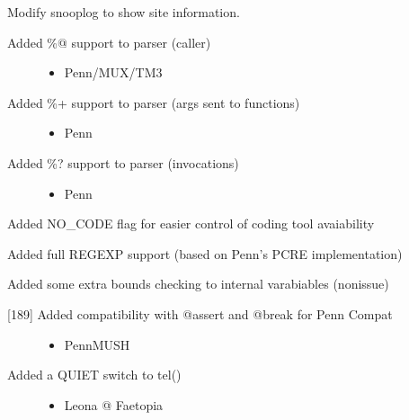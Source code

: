 \documentclass[letterpaper,10pt,english]{sphinxmanual}
\begin{document}
\sphinxAtStartPar
Modify snooplog to show site information.
\begin{description}
\item[{Added \%@ support to parser (caller)}] \leavevmode\begin{itemize}
\item {} 
\sphinxAtStartPar
Penn/MUX/TM3

\end{itemize}

\item[{Added \%+ support to parser (args sent to functions)}] \leavevmode\begin{itemize}
\item {} 
\sphinxAtStartPar
Penn

\end{itemize}

\item[{Added \%? support to parser (invocations)}] \leavevmode\begin{itemize}
\item {} 
\sphinxAtStartPar
Penn

\end{itemize}

\end{description}

\sphinxAtStartPar
Added NO\_CODE flag for easier control of coding tool avaiability

\sphinxAtStartPar
Added full REGEXP support (based on Penn’s PCRE implementation)

\sphinxAtStartPar
Added some extra bounds checking to internal varabiables (non\sphinxhyphen{}issue)
\begin{description}
\item[{{[}18\sphinxhyphen{}9{]} Added compatibility with @assert and @break for Penn Compat}] \leavevmode\begin{itemize}
\item {} 
\sphinxAtStartPar
PennMUSH

\end{itemize}

\item[{Added a QUIET switch to tel()}] \leavevmode\begin{itemize}
\item {} 
\sphinxAtStartPar
Leona @ Faetopia

\end{itemize}

\end{description}
\end{document}
